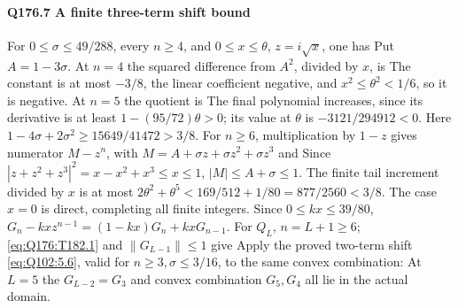 \paragraph{Q176.7 A finite three-term shift bound}\label{part:Q176.7}
For $0\le\allowbreak \sigma\le\allowbreak 49/288$, every $n\ge\allowbreak 4$, and $0\le\allowbreak  x\le\allowbreak \theta$,
$z=\allowbreak i\sqrt x$, one has
Put $A=\allowbreak 1-3\sigma$. At $n=\allowbreak 4$ the squared difference from $A^2$,
divided by $x$, is
The constant is at most $-3/8$, the linear coefficient negative,
and $x^2\le\allowbreak \theta^2<\allowbreak 1/6$, so it is negative.
At $n=\allowbreak 5$ the quotient is
The final polynomial increases, since its derivative is at least
$1-(95/72)\theta>\allowbreak 0$; its value at $\theta$ is $-3121/294912<\allowbreak 0$.
Here $1-4\sigma+2\sigma^2\ge\allowbreak 15649/41472>\allowbreak 3/8$.
For $n\ge\allowbreak 6$, multiplication by $1-z$ gives numerator $M-z^n$, with
$M=\allowbreak A+\sigma z+\sigma z^2+\sigma z^3$ and
Since $|z+z^2+z^3|^2=\allowbreak x-x^2+x^3\le\allowbreak  x\le\allowbreak 1$,
$|M|\le\allowbreak  A+\sigma\le\allowbreak 1$.
The finite tail increment divided by $x$ is at most
$2\theta^2+\theta^5<\allowbreak 169/512+1/80=\allowbreak 877/2560<\allowbreak 3/8$.
The case $x=\allowbreak 0$ is direct, completing all finite integers.
Since $0\le\allowbreak  kx\le\allowbreak 39/80$,
$G_n-kxz^{n-1}=\allowbreak (1-kx)G_n+kxG_{n-1}$.
For $Q_L$, $n=\allowbreak L+1\ge\allowbreak 6$; \eqref{eq:Q176:T182.1} and
$\|G_{L-1}\|\le\allowbreak 1$ give
Apply the proved two-term shift \eqref{eq:Q102:5.6}, valid for
$n\ge\allowbreak 3,\allowbreak \sigma\le\allowbreak 3/16$, to the same convex combination:
At $L=\allowbreak 5$ the $G_{L-2}=\allowbreak G_3$ and convex combination $G_5,\allowbreak G_4$ all
lie in the actual domain.

